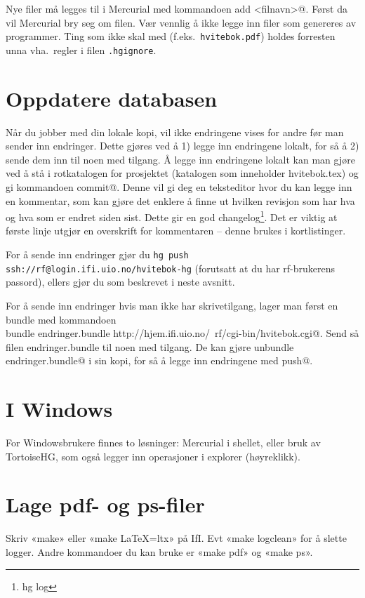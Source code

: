 \documentclass[11pt,norsk,a4paper,pointlessnumbers]{scrbook}
\begin{document}
Nye filer må legges til i Mercurial med kommandoen \verb@hg add <filnavn>@.
Først da vil Mercurial bry seg om filen. Vær vennlig å ikke legge inn filer
som genereres av programmer.
Ting som ikke skal med (f.eks.~\verb|hvitebok.pdf|) holdes forresten unna
vha.~regler i filen \verb|.hgignore|.

\section{Oppdatere databasen}
Når du jobber med din lokale kopi, vil ikke endringene vises for andre før man
sender inn endringer. Dette gjøres ved å 1) legge inn endringene lokalt, for så
å 2) sende dem inn til noen med tilgang. Å legge inn endringene lokalt kan man 
gjøre ved å stå i rotkatalogen for prosjektet (katalogen som inneholder
hvitebok.tex) og gi kommandoen \verb@hg commit@. Denne vil gi deg en
teksteditor hvor du kan legge inn en kommentar, som kan gjøre det enklere å
finne ut hvilken revisjon som har hva og hva som er endret siden sist.
Dette gir en god changelog\footnote{hg log}.
Det er viktig at første linje utgjør en overskrift for kommentaren -- denne
brukes i kortlistinger.

For å sende inn endringer gjør du
\verb|hg push ssh://rf@login.ifi.uio.no/hvitebok-hg|
(forutsatt at du har rf-brukerens passord), ellers gjør du som beskrevet i neste
avsnitt.

For å sende inn endringer hvis man ikke har skrivetilgang, lager man først en
bundle med kommandoen\\
\verb@hg bundle endringer.bundle http://hjem.ifi.uio.no/~rf/cgi-bin/hvitebok.cgi@.
Send så filen endringer.bundle til noen med tilgang. De kan gjøre
\verb@hg unbundle endringer.bundle@ i sin kopi, for så å legge inn endringene
med \verb@hg push@.

\section{I Windows}
For Windowsbrukere finnes to løsninger: Mercurial i shellet, eller bruk av TortoiseHG,
som også legger inn operasjoner i explorer (høyreklikk).

\section{Lage pdf- og ps-filer}
Skriv «make» eller «make LaTeX=ltx» på IfI.
Evt «make logclean» for å slette logger.
Andre kommandoer du kan bruke er «make pdf» og «make ps».
\end{document}
